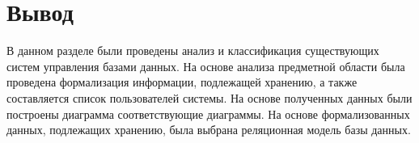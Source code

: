 \section{Вывод}
В данном разделе были проведены анализ и классификация существующих систем управления базами данных. На основе анализа предметной области была проведена формализация информации, подлежащей хранению, а также составляется список пользователей системы. На основе полученных данных были построены диаграмма соответствующие диаграммы. На основе формализованных данных, подлежащих хранению, была выбрана реляционная модель базы данных.
